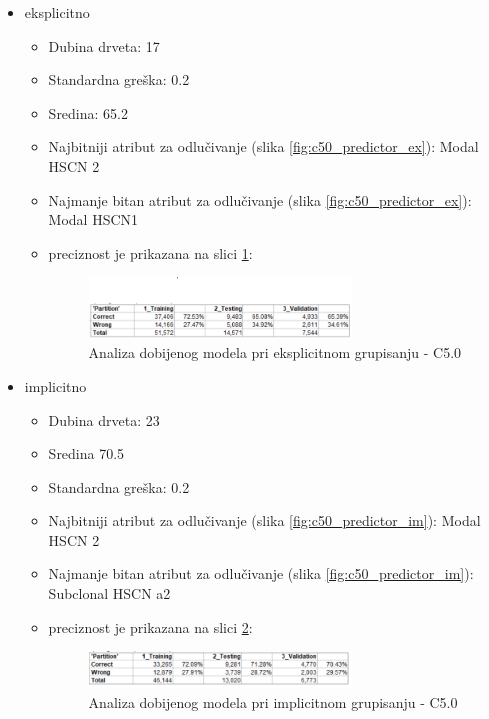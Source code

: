 \documentclass[a4paper]{article}
\begin{document}
\begin{itemize}
    \item eksplicitno
        \begin{itemize}
            \item Dubina drveta: 17
            \item Standardna greška: 0.2
            \item Sredina: 65.2
            \item Najbitniji atribut za odlučivanje (slika \ref{fig:c50_predictor_ex}): Modal HSCN 2
            \item Najmanje bitan atribut za odlučivanje (slika \ref{fig:c50_predictor_ex}): Modal HSCN1
            \item preciznost je prikazana na slici \ref{fig:c50_analysis_ex}:
            \begin{figure}[ht]
                \centering
                \includegraphics[width=0.7\textwidth]{C50_analysis_explicit.PNG}
                \caption{Analiza dobijenog modela pri eksplicitnom grupisanju - C5.0}
                \label{fig:c50_analysis_ex}
            \end{figure}
        \end{itemize}
    \item implicitno
    \begin{itemize}
        \item Dubina drveta: 23
        \item Sredina 70.5
            \item Standardna greška: 0.2
            \item Najbitniji atribut za odlučivanje (slika \ref{fig:c50_predictor_im}): Modal HSCN 2
            \item Najmanje bitan atribut za odlučivanje (slika \ref{fig:c50_predictor_im}): Subclonal HSCN a2
            \item preciznost je prikazana na slici \ref{fig:c50_analysis_im}:
            \begin{figure}[ht]
                \centering
                \includegraphics[width=0.7\textwidth]{C50_analysis_implicit.PNG}
                \caption{Analiza dobijenog modela pri implicitnom grupisanju - C5.0}
                \label{fig:c50_analysis_im}
            \end{figure}
    \end{itemize}
\end{itemize}
\end{document}
